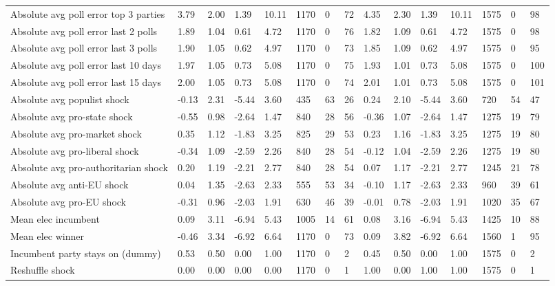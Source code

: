 \begin{longtable}{lllllllllllllll}
Absolute avg poll error top 3 parties & 3.79 & 2.00 & 1.39 & 10.11 & 1170 & 0 & 72 & 4.35 & 2.30 & 1.39 & 10.11 & 1575 & 0 & 98\\
Absolute avg poll error last 2 polls & 1.89 & 1.04 & 0.61 & 4.72 & 1170 & 0 & 76 & 1.82 & 1.09 & 0.61 & 4.72 & 1575 & 0 & 98\\
\addlinespace
Absolute avg poll error last 3 polls & 1.90 & 1.05 & 0.62 & 4.97 & 1170 & 0 & 73 & 1.85 & 1.09 & 0.62 & 4.97 & 1575 & 0 & 95\\
Absolute avg poll error last 10 days & 1.97 & 1.05 & 0.73 & 5.08 & 1170 & 0 & 75 & 1.93 & 1.01 & 0.73 & 5.08 & 1575 & 0 & 100\\
Absolute avg poll error last 15 days & 2.00 & 1.05 & 0.73 & 5.08 & 1170 & 0 & 74 & 2.01 & 1.01 & 0.73 & 5.08 & 1575 & 0 & 101\\
Absolute avg populist shock & -0.13 & 2.31 & -5.44 & 3.60 & 435 & 63 & 26 & 0.24 & 2.10 & -5.44 & 3.60 & 720 & 54 & 47\\
Absolute avg pro-state shock & -0.55 & 0.98 & -2.64 & 1.47 & 840 & 28 & 56 & -0.36 & 1.07 & -2.64 & 1.47 & 1275 & 19 & 79\\
\addlinespace
Absolute avg pro-market shock & 0.35 & 1.12 & -1.83 & 3.25 & 825 & 29 & 53 & 0.23 & 1.16 & -1.83 & 3.25 & 1275 & 19 & 80\\
Absolute avg pro-liberal shock & -0.34 & 1.09 & -2.59 & 2.26 & 840 & 28 & 54 & -0.12 & 1.04 & -2.59 & 2.26 & 1275 & 19 & 80\\
Absolute avg pro-authoritarian shock & 0.20 & 1.19 & -2.21 & 2.77 & 840 & 28 & 54 & 0.07 & 1.17 & -2.21 & 2.77 & 1245 & 21 & 78\\
Absolute avg anti-EU shock & 0.04 & 1.35 & -2.63 & 2.33 & 555 & 53 & 34 & -0.10 & 1.17 & -2.63 & 2.33 & 960 & 39 & 61\\
Absolute avg pro-EU shock & -0.31 & 0.96 & -2.03 & 1.91 & 630 & 46 & 39 & -0.01 & 0.78 & -2.03 & 1.91 & 1020 & 35 & 67\\
\addlinespace
Mean elec incumbent & 0.09 & 3.11 & -6.94 & 5.43 & 1005 & 14 & 61 & 0.08 & 3.16 & -6.94 & 5.43 & 1425 & 10 & 88\\
Mean elec winner & -0.46 & 3.34 & -6.92 & 6.64 & 1170 & 0 & 73 & 0.09 & 3.82 & -6.92 & 6.64 & 1560 & 1 & 95\\
Incumbent party stays on (dummy) & 0.53 & 0.50 & 0.00 & 1.00 & 1170 & 0 & 2 & 0.45 & 0.50 & 0.00 & 1.00 & 1575 & 0 & 2\\
Reshuffle shock & 0.00 & 0.00 & 0.00 & 0.00 & 1170 & 0 & 1 & 1.00 & 0.00 & 1.00 & 1.00 & 1575 & 0 & 1\\

\end{longtable}
